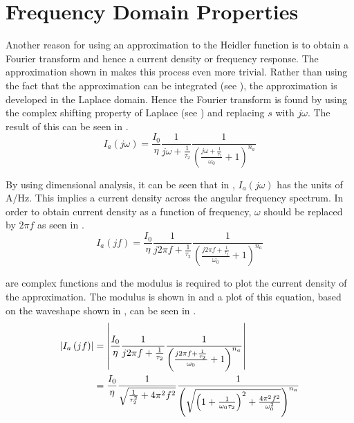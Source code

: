\section{Frequency Domain Properties}
\label{sec:approx_frequency_domain_analysis}
Another reason for using an approximation to the Heidler function is to obtain a Fourier transform and hence a current density or frequency response. The approximation shown in  makes this process even more trivial. Rather than using the fact that the approximation can be integrated (see ), the approximation is developed in the Laplace domain. Hence the Fourier transform is found by using the complex shifting property of Laplace (see ) and replacing $s$ with $j\omega$. The result of this can be seen in .
\begin{equation}
    I_a \left( j\omega \right) = \frac{I_0}{\eta}\frac{1}{j\omega + \frac{1}{\tau_2}}\frac{1}{\left ( \frac{j\omega + \frac{1}{\tau_2}}{\omega_0} + 1 \right )^{n_a}}
    \label{eqn:approx_fourier}
\end{equation}

By using dimensional analysis, it can be seen that in , $I_a(j\omega)$ has the units of A/Hz. This implies a current density across the angular frequency spectrum. In order to obtain current density as a function of frequency, $\omega$ should be replaced by $2 \pi f$ as seen in .
\begin{equation}
    I_a \left( jf \right) = \frac{I_0}{\eta}\frac{1}{j2\pi f + \frac{1}{\tau_2}}\frac{1}{\left ( \frac{j2\pi f + \frac{1}{\tau_2}}{\omega_0} + 1 \right )^{n_a}}
    \label{eqn:approx_fourier_freq}
\end{equation}

 are complex functions and the modulus is required to plot the current density of the approximation. The modulus is shown in  and a plot of this equation, based on the waveshape shown in , can be seen in .
\begin{align}
    \left | I_a \left( jf \right) \right | & = \left | \frac{I_0}{\eta}\frac{1}{j2\pi f + \frac{1}{\tau_2}}\frac{1}{\left ( \frac{j2\pi f + \frac{1}{\tau_2}}{\omega_0} + 1 \right )^{n_a}} \right | \notag\\
    & = \frac{I_0}{\eta} \frac{1}{\sqrt{ \frac{1}{\tau _2^{2}} + 4 \pi^2 f^2}} \frac{1}{\left ( \sqrt{\left ( 1 + \frac{1}{\omega_0 \tau_2} \right )^2 + \frac{4 \pi^2 f^2}{\omega_{0}^{2}}} \right )^{n_a}}
    \label{eqn:approx_fourier_mod}
\end{align}

